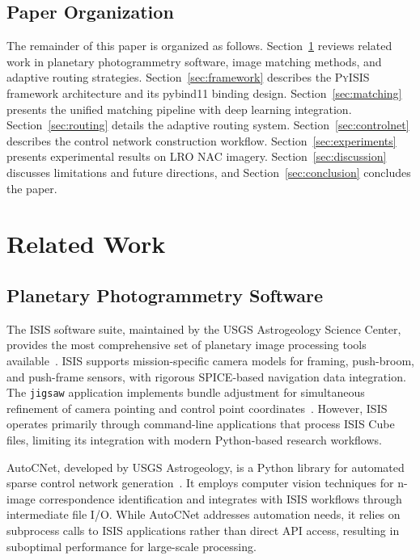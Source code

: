 \documentclass[lettersize,journal]{IEEEtran}
\newcommand{\pyisis}{\textsc{PyISIS}}
\begin{document}
\subsection{Paper Organization}

The remainder of this paper is organized as follows. Section~\ref{sec:related} reviews related work in planetary photogrammetry software, image matching methods, and adaptive routing strategies. Section~\ref{sec:framework} describes the \pyisis{} framework architecture and its pybind11 binding design. Section~\ref{sec:matching} presents the unified matching pipeline with deep learning integration. Section~\ref{sec:routing} details the adaptive routing system. Section~\ref{sec:controlnet} describes the control network construction workflow. Section~\ref{sec:experiments} presents experimental results on LRO NAC imagery. Section~\ref{sec:discussion} discusses limitations and future directions, and Section~\ref{sec:conclusion} concludes the paper.


\section{Related Work}\label{sec:related}

\subsection{Planetary Photogrammetry Software}

The ISIS software suite, maintained by the USGS Astrogeology Science Center, provides the most comprehensive set of planetary image processing tools available~\cite{usgs2024isis}. ISIS supports mission-specific camera models for framing, push-broom, and push-frame sensors, with rigorous SPICE-based navigation data integration. The \texttt{jigsaw} application implements bundle adjustment for simultaneous refinement of camera pointing and control point coordinates~\cite{edmundson2012jigsaw}. However, ISIS operates primarily through command-line applications that process ISIS Cube files, limiting its integration with modern Python-based research workflows.

AutoCNet, developed by USGS Astrogeology, is a Python library for automated sparse control network generation~\cite{laura2018autocnet}. It employs computer vision techniques for n-image correspondence identification and integrates with ISIS workflows through intermediate file I/O. While AutoCNet addresses automation needs, it relies on subprocess calls to ISIS applications rather than direct API access, resulting in suboptimal performance for large-scale processing.
\end{document}

